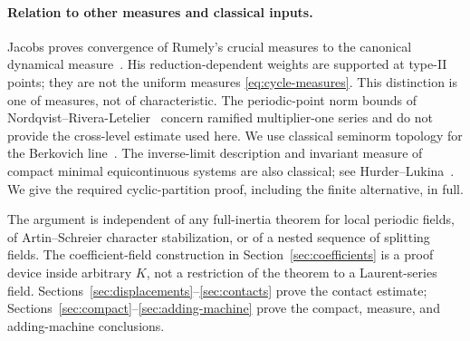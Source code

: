 \paragraph{Relation to other measures and classical inputs.}
Jacobs proves convergence of Rumely's crucial measures to the
canonical dynamical measure~\cite[Theorem 2]{jacobs2017crucial}.
His reduction-dependent weights are supported at type-II points;
they are not the uniform measures \eqref{eq:cycle-measures}.
This distinction is one of measures, not of characteristic.
The periodic-point norm bounds of
Nordqvist--Rivera-Letelier~\cite[Theorem 3]{nordqvist2020residue}
concern ramified multiplier-one series and do not provide the
cross-level estimate used here. We use classical seminorm topology
for the Berkovich line~\cite{baker2007berkovich}. The inverse-limit
description and invariant measure of compact minimal equicontinuous
systems are also classical; see
Hurder--Lukina~\cite[author version, Sections 2.2--2.3]{hurder2025essential}.
We give the required cyclic-partition proof, including the finite
alternative, in full.

The argument is independent of any full-inertia theorem for local
periodic fields, of Artin--Schreier character stabilization, or of a
nested sequence of splitting fields. The coefficient-field construction
in Section~\ref{sec:coefficients} is a proof device inside arbitrary
$K$, not a restriction of the theorem to a Laurent-series field.
Sections~\ref{sec:displacements}--\ref{sec:contacts} prove the contact
estimate; Sections~\ref{sec:compact}--\ref{sec:adding-machine} prove
the compact, measure, and adding-machine conclusions.

